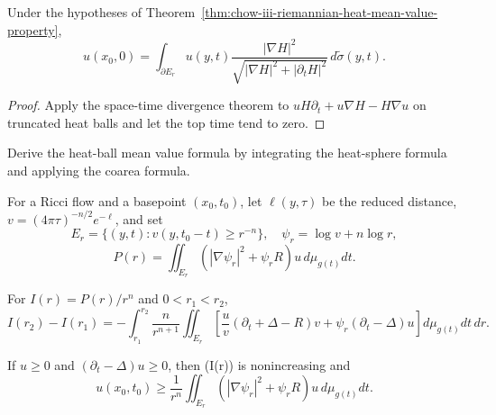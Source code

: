 \begin{theorem}
\label{thm:chow-iii-heat-sphere-mean-value-property}
Under the hypotheses of Theorem~\ref{thm:chow-iii-riemannian-heat-mean-value-property},
\[
 u(x_0,0)=\int_{\partial E_r}u(y,t)
 \frac{|\nabla H|^2}{\sqrt{|\nabla H|^2+|\partial_tH|^2}}
 \,d\widetilde\sigma(y,t).
\]
\end{theorem}
\begin{proof}
\sketch Apply the space-time divergence theorem to
\(uH\partial_t+u\nabla H-H\nabla u\) on truncated heat balls and let the
top time tend to zero.
\end{proof}

\begin{claim}
\label{clm:chow-iii-heat-sphere-coarea-exercise}
Derive the heat-ball mean value formula by integrating the heat-sphere formula
and applying the coarea formula.
\end{claim}

For a Ricci flow and a basepoint \((x_0,t_0)\), let \(\ell(y,\tau)\) be the
reduced distance, \(v=(4\pi\tau)^{-n/2}e^{-\ell}\), and set
\[
 E_r=\{(y,t):v(y,t_0-t)\ge r^{-n}\},\quad
 \psi_r=\log v+n\log r,
\]
\[
 P(r)=\iint_{E_r}(|\nabla\psi_r|^2+\psi_rR)u\,d\mu_{g(t)}dt.
\]

\begin{theorem}
\label{thm:chow-iii-ricci-flow-local-mean-value-monotonicity}
For \(I(r)=P(r)/r^n\) and \(0<r_1<r_2\),
\[
 I(r_2)-I(r_1)=-\int_{r_1}^{r_2}\frac n{r^{n+1}}
 \iint_{E_r}\left[
 \frac uv(\partial_t+\Delta-R)v+\psi_r(\partial_t-\Delta)u
 \right]d\mu_{g(t)}dt\,dr.
\]
\end{theorem}

\begin{corollary}
\label{cor:chow-iii-ricci-flow-supersolution-mean-value}
If \(u\ge0\) and \((\partial_t-\Delta)u\ge0\), then (I(r)) is
nonincreasing and
\[
 u(x_0,t_0)\ge\frac1{r^n}\iint_{E_r}
 (|\nabla\psi_r|^2+\psi_rR)u\,d\mu_{g(t)}dt.
\]
\end{corollary}

